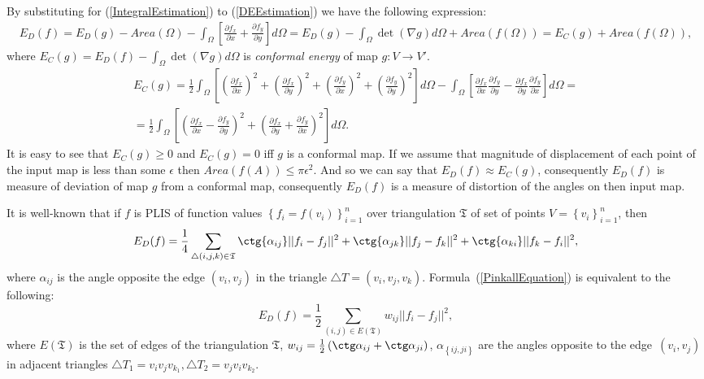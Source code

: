 \documentclass{article}
\begin{document}
By substituting for (\ref{IntegralEstimation}) to (\ref{DEEstimation}) we have the following expression:
\begin{multline}
  E_D(f) = E_D(g) - Area(\Omega) - \int_{\Omega}{\left[\frac{\partial f_x}{\partial x} + \frac{\partial f_y}{\partial y}\right]} d\Omega = E_D(g) - \int_{\Omega} \det \left(\nabla g \right) d\Omega + Area(f(\Omega)) 
  = E_C(g) + Area(f(\Omega)),
\end{multline}
where $ E_C(g) = E_D(f) - \int_{\Omega} \det \left(\nabla g \right) d\Omega$ is \textit{conformal energy} of map $g: V \to V'$. 
\begin{multline*}
 E_C(g) = \frac{1}{2} \int_{\Omega} \left[\left(\frac{\partial f_x}{\partial x}\right)^2 + \left(\frac{\partial f_x}{\partial y}\right)^2 + 
 \left(\frac{\partial f_y}{\partial x}\right)^2  + \left(\frac{\partial f_y}{\partial y}\right)^2 \right] d\Omega - \int_{\Omega}{\left[\frac{\partial f_x}{\partial x} \frac{\partial f_y}{\partial y} -
 \frac{\partial f_x}{\partial y} \frac{\partial f_y}{\partial x} \right]} d \Omega = \\
 = \frac{1}{2} \int_{\Omega}\left[ \left(\frac{\partial f_x}{\partial x} - \frac{\partial f_y}{\partial y} \right)^2 + \left( \frac{\partial f_x}{\partial y} + \frac{\partial f_y}{\partial x} \right)^2 \right] d\Omega.
\end{multline*}
It is easy to see that $E_C(g) \ge 0$ and $E_C(g) = 0$ iff $g$ is a conformal map. If we assume that magnitude of displacement of each point of the input map is less than some $\epsilon$ 
then $Area(f(A)) \le \pi \epsilon^2$. And so we can say that $E_D(f) \approx E_C(g)$, consequently $E_D(f)$ is measure of deviation of map $g$ from a conformal map, consequently $E_D(f)$ is a measure of distortion of the angles on then input map.

It is well-known that if $f$ is PLIS of function values $\left\{f_i = f(v_i)\right\}_{i=1}^n$ over triangulation $\mathfrak{T}$ of set of points $V = \left\{v_i\right\}_{i=1}^n$, then  
\begin{equation}
\label{PinkallEquation}
  E_D(f) = \frac{1}{4} \sum_{\triangle (i, j, k) \in \mathfrak{T}}
  {\ctg{\alpha_{ij}}||f_i - f_j||^2 + \ctg{\alpha_{jk}}||f_j - f_k||^2 + \ctg{\alpha_{ki}}||f_k - f_i||^2},
\end{equation}
where $\alpha_{ij}$ is the angle opposite the edge $(v_i, v_j)$ in the triangle $\triangle T = (v_i, v_j, v_k)$. Formula~(\ref{PinkallEquation}) is equivalent to the following:
\begin{equation}
  \label{EDOverEdges}
  E_D(f) = \frac{1}{2} \sum_{\left( i, j \right) \in E\left(\mathfrak{T}\right)}{w_{ij} ||f_i - f_j||^2}, 
\end{equation}
where $E(\mathfrak{T})$ is the set of edges of the triangulation $\mathfrak{T}$, $w_{ij} = \frac{1}{2}\left(\ctg\alpha_{ij} + \ctg\alpha_{ji}\right)$, $\alpha_{\left\{{ij, ji}\right\}}$ are the angles opposite 
to the edge~$(v_i, v_j)$ in adjacent triangles $\triangle T_1 = v_i v_j v_{k_1}, \triangle T_2 = v_j v_i v_{k_2}$.
\end{document}
